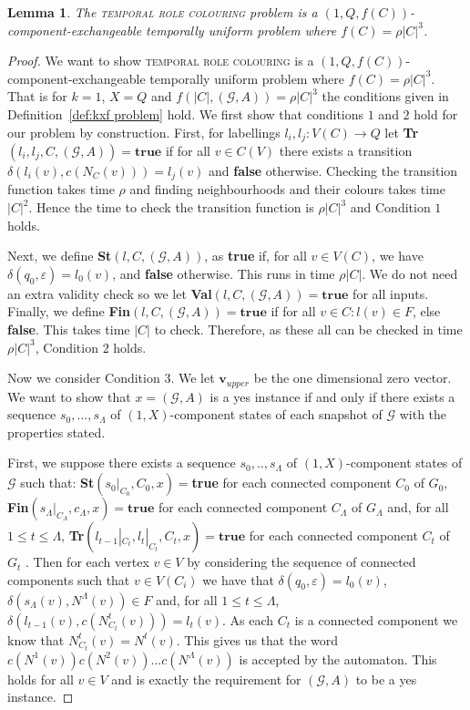 \documentclass[10pt,a4paper]{amsart}
\newtheorem{lemma}{Lemma}
\begin{document}
\begin{lemma} \label{lem:1Qf state}
   The \textsc{temporal role colouring} problem is a $(1,Q,f(C))$-component-exchangeable temporally uniform problem where $f(C)=\rho|C|^3$.
\end{lemma}

\begin{proof}
We want to show \textsc{temporal role colouring} is a $(1,Q,f(C))$-component-exchangeable temporally uniform problem where $f(C)=\rho|C|^3$. That is for $k=1$, $X=Q$ and $f(|C|,(\mathcal{G},A))=\rho|C|^3$ the conditions given in Definition~\ref{def:kxf problem} hold.
We first show that conditions $1$ and $2$ hold for our problem by construction.
First, for labellings $l_i,l_j: V(C) \rightarrow Q$ let \textbf{Tr}$(l_i,l_j,C,(\mathcal{G},A))=\textbf{true}$ if for all $v \in C(V)$ there exists a transition $\delta(l_i(v),c(N_C(v)))=l_j(v)$ and \textbf{false} otherwise. Checking the transition function takes time $\rho$ and finding neighbourhoods and their colours takes time $|C|^2$. Hence the time to check the transition function is $\rho|C|^3$ and Condition $1$ holds.

Next, we define \textbf{St}$(l, C,(\mathcal{G},A))$, as \textbf{true} if, for all $v \in V(C)$, we have $\delta(q_0,\varepsilon)=l_0(v)$, and \textbf{false} otherwise. This runs in time $\rho|C|$. We do not need an extra validity check so we let \textbf{Val}$(l,C,(\mathcal{G},A)) =\textbf{true}$ for all inputs. Finally, we define \textbf{Fin}$(l,C,(\mathcal{G},A))=\textbf{true}$ if for all $v\in C: l(v)\in F$, else \textbf{false}. This takes time $|C|$ to check. Therefore, as these all can be checked in time $\rho|C|^3$, Condition $2$ holds. 

Now we consider Condition $3$. We let $\textbf{v}_{upper}$ be the one dimensional zero vector. We want to show that $x=(\mathcal{G},A)$ is a yes instance if and only if there exists a sequence $s_0,...,s_\Lambda$ of $(1,X)$-component states of each snapshot of $\mathcal{G}$ with the properties stated.

First, we suppose there exists a sequence $s_0,..,s_\Lambda$ of $(1,X)$-component states of $\mathcal{G}$ such that:
\textbf{St}$(s_0|_{C_0},C_0,x)=$\textbf{true} for each connected component $C_0$ of $G_0$, \textbf{Fin}$(s_\Lambda|_{C_\Lambda},c_\Lambda,x)=\textbf{true}$ for each connected component $C_\Lambda$ of $G_\Lambda$ and, for all $1\leq t \leq \Lambda$, \textbf{Tr}$(l_{t-1}|_{C_t},l_t|_{C_t},C_t,x) = \textbf{true}$ for each connected component $C_t$ of $G_t$ .
Then for each vertex $v \in V$ by considering the sequence of connected components such that $v \in V(C_i)$ we have that $\delta(q_0,\varepsilon)=l_0(v)$, $\delta(s_\Lambda(v),N^\Lambda(v))\in F$ and, for all $1\leq t \leq \Lambda$, $\delta(l_{t-1}(v),c(N^t_{C_t}(v)))=l_t(v)$.
As each $C_t$ is a connected component we know that $N^t_{C_t}(v)=N^t(v)$. This gives us that the word  $c(N^1(v))c(N^2(v))...c(N^\Lambda(v))$ is accepted by the automaton. This holds for all $v \in V$ and is exactly the requirement for $(\mathcal{G},A)$ to be a yes instance.




\end{proof}
\end{document}

